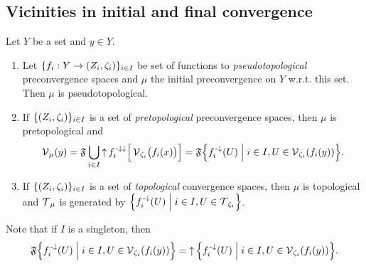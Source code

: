 \subsection{Vicinities in initial and final convergence}
\begin{proposition} \label{pretopologicalInitialConvergence}
Let $Y$ be a set and $y\in Y$.
\begin{enumerate}
\item Let $\{f_i: Y\to \sSet{Z_i, \zeta_i}\}_{i\in I}$ be set of functions to \emph{pseudotopological} preconvergence spaces and $\mu$ the initial preconvergence on $Y$ w.r.t. this set. Then $\mu$ is pseudotopological.
\item If $\{\sSet{Z_i, \zeta_i}\}_{i\in I}$ is a set of \emph{pretopological} preconvergence spaces, then $\mu$ is pretopological and
\[ \vicinity_\mu(y) = \mathfrak{F}\bigcup_{i\in I} \upset f_i^{\preimf\imf}\Big[\vicinity_{\zeta_i}\!\big(f_i(x)\big)\Big] = \mathfrak{F}\setbuilder{f_i^\preimf(U)}{i\in I, U\in \vicinity_{\zeta_i}(f_i(y))}. \]
\item If $\{\sSet{Z_i, \zeta_i}\}_{i\in I}$ is a set of \emph{topological} convergence spaces, then $\mu$ is topological and $\operatorname{\mathcal{T}}_\mu$ is generated by $\setbuilder{f_i^\preimf(U)}{i\in I, U\in \topology_{\zeta_i}}$.
\end{enumerate}
\end{proposition}
Note that if $I$ is a singleton, then
\[ \mathfrak{F}\setbuilder{f_i^\preimf(U)}{i\in I, U\in \vicinity_{\zeta_i}(f_i(y))} = \upset\setbuilder{f_i^\preimf(U)}{i\in I, U\in \vicinity_{\zeta_i}(f_i(y))}. \]
